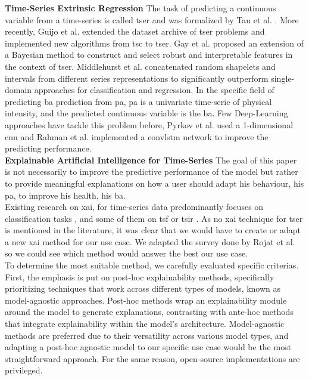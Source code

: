 \textbf{Time-Series Extrinsic Regression}
The task of predicting a continuous variable from a time-series is called  
\acrfull{tser} and was formalized by Tan et al. \cite{tan_time_2021}. More recently, Guijo et al. \cite{guijo-rubio_unsupervised_2023} extended the dataset archive \cite{tan_monash_2020} of \acrshort{tser} problems and implemented new algorithms from \acrfull{tsc} to \acrshort{tser}. Gay et al. \cite{gay_interpretable_2021} proposed an extension of a Bayesian method to construct and select robust and interpretable features in the context of \acrshort{tser}. 
Middlehurst et al. \cite{middlehurst_extracting_2023} concatenated random shapelets and intervals from different series representations to significantly outperform single-domain approaches for classification and regression. In the specific field of predicting \acrshort{ba} prediction from \acrshort{pa}, \acrshort{pa} is a univariate time-serie of physical intensity, and the predicted continuous variable is the \acrshort{ba}. 
Few Deep-Learning approaches have tackle this problem before, Pyrkov et al. \cite{pyrkov_extracting_2018} used a 1-dimensional \acrfull{cnn} and Rahman et al. \cite{rahman_deep_2019} implemented a \acrfull{convlstm} network to improve the predicting performance. \\

\textbf{Explainable Artificial Intelligence for Time-Series}
The goal of this paper is not necessarily to improve the predictive performance of the model but rather to provide meaningful explanations on how a user should adapt his behaviour, his \acrshort{pa}, to improve his health, his \acrshort{ba}. \\

Existing research on \acrfull{xai},  for time-series data predominantly focuses on classification tasks \cite{theissler_explainable_2022}, and some of them on \acrfull{tsf} or \acrfull{tsir} \cite{rojat_explainable_2021}. As no \acrshort{xai} technique for \acrshort{tser} is mentioned in the literature, it was clear that we would have to create or adapt a new \acrshort{xai} method for our use case. 
We adapted the survey done by Rojat et al. \cite{rojat_explainable_2021} so we could see which method would answer the best our use case. \\

To determine the most suitable method, we carefully evaluated specific criterias.
First, the emphasis is put on post-hoc explainability methods, specifically prioritizing techniques that work across different types of models, known as model-agnostic approaches.
Post-hoc methods wrap an explainability module around the model to generate explanations, contrasting with ante-hoc methods that integrate explainability within the model's architecture.
Model-agnostic methods are preferred due to their versatility across various model types, and adapting a post-hoc agnostic model to our specific use case would be the most straightforward approach. For the same reason, open-source implementations are privileged. \\

